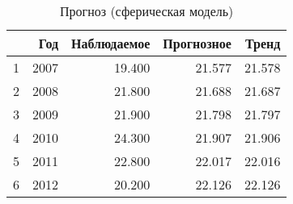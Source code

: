 \begin{table}[ht]
\centering
\begin{tabular}{rrrrr}
  \hline
 & Год & Наблюдаемое & Прогнозное & Тренд \\ 
  \hline
1 & 2007 & 19.400 & 21.577 & 21.578 \\ 
  2 & 2008 & 21.800 & 21.688 & 21.687 \\ 
  3 & 2009 & 21.900 & 21.798 & 21.797 \\ 
  4 & 2010 & 24.300 & 21.907 & 21.906 \\ 
  5 & 2011 & 22.800 & 22.017 & 22.016 \\ 
  6 & 2012 & 20.200 & 22.126 & 22.126 \\ 
   \hline
\end{tabular}
\caption{Прогноз (сферическая модель)} 
\label{table:prediction-manual}
\end{table}

